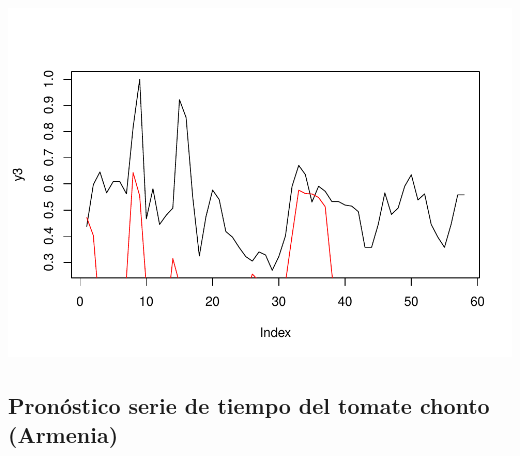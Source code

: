 \documentclass[
]{book}
\begin{document}
\includegraphics{bookdown-demo_files/figure-latex/unnamed-chunk-193-1.pdf}

\hypertarget{pronuxf3stico-serie-de-tiempo-del-tomate-chonto-armenia}{%
\subsection{Pronóstico serie de tiempo del tomate chonto (Armenia)}\label{pronuxf3stico-serie-de-tiempo-del-tomate-chonto-armenia}}
\end{document}
